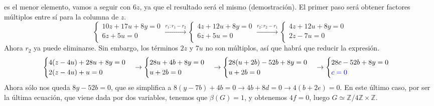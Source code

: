 \documentclass[a4paper, 11pt]{extarticle}
\begin{document}
es el menor elemento, vamos a seguir con \(6z\), ya que el resultado será el
mismo (demostración). El primer paso será obtener factores múltiplos entre sí para la columna
de \(z\).
$$\begin{cases}
10z+17u+8y=0\\
6z+5u=0\\
\end{cases} \xrightarrow{r_1:r_1-r_2}
\begin{cases}
4z+12u+8y=0\\
6z+5u=0\\
\end{cases} \xrightarrow{r_2:r_2-r_1} 
\begin{cases}
4z+12u+8y=0\\
2z-7u=0\\
\end{cases}$$
Ahora \(r_2\) ya puede eliminarse. Sin embargo, los términos \(2z\) y \(7u\)
 no son múltiplos, así que habrá que reducir la expresión.
$$\begin{cases}
4(z-4u)+28u+8y=0\\
2(z-4u)+u=0\\
\end{cases}
\rightarrow 
\begin{cases}
28u+4b+8y=0\\
u+2b=0\\
\end{cases}
 \rightarrow 
\begin{cases}
28(u+2b)-52b+8y=0\\
u+2b=0\\
\end{cases}
\rightarrow 
\begin{cases}
28c-52b+8y=0\\
\textcolor{blue}{c=0}\\
\end{cases}$$
Ahora sólo nos queda \(8y-52b=0\), que se simplifica a \(8(y-7b) + 4b=0
\rightarrow 4b+8d = 0 \rightarrow 4(b+2e)=0\). En este último caso, por ser la
última ecuación, que viene dada por dos variables, tenemos que \(\beta(G) = 1\), y obtenemos \(4f=0\), luego \(G \simeq \mathbb{Z}/ 4 \mathbb{Z} \times
\mathbb{Z}\).
\end{document}
